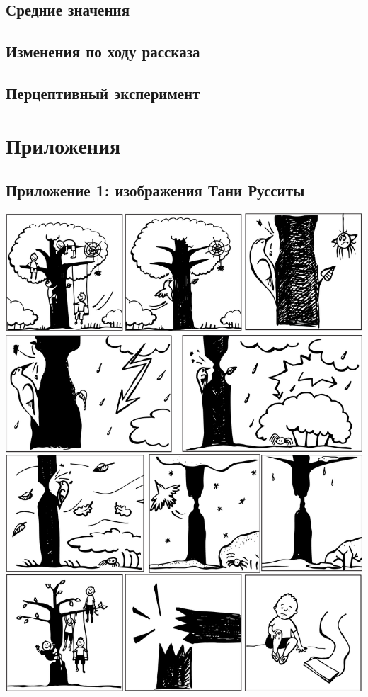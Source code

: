 \subsection{Средние значения}
\subsection{Изменения по ходу рассказа}
\subsection{Перцептивный эксперимент}
\pagebreak
\footnotesize


\normalsize
\section{Приложения}
\subsection{Приложение 1: изображения Тани Русситы} \label{pictures}
\noindent \includegraphics[width=\linewidth]{pauk.jpg}\\

